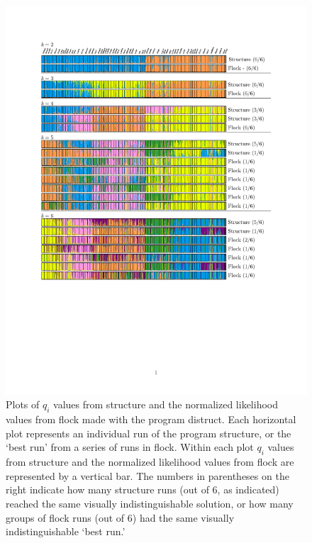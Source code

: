 \begin{figure}
\begin{center}
    \includegraphics[width=\textwidth]{images/Figures-Pat/Flock-Fig1.pdf}   %
    \caption{Plots of $q_i$ values from {\sc structure} and the normalized likelihood values 
from {\sc flock} made with the program {\sc distruct}. Each horizontal plot represents an individual run of the program {\sc structure}, or the `best run' from a series of runs in {\sc flock}. Within each plot 
$q_i$ values from {\sc structure} and the normalized likelihood values 
from {\sc flock}  are represented by a 
vertical bar. The numbers in parentheses on the right indicate how many {\sc structure} runs (out of 6, as indicated) reached the same visually indistinguishable solution, or how many groups of {\sc flock} runs (out of 6) had the same visually indistinguishable `best run.'}
    \label{fig:qplots}
\end{center}
\end{figure}


